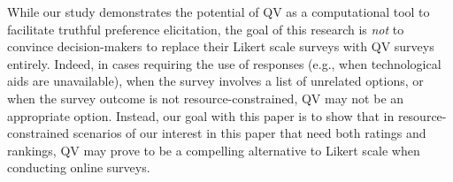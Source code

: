 While our study demonstrates the potential of QV as a computational tool to facilitate truthful preference elicitation, the goal of this research is \textit{not} to convince decision-makers to replace their Likert scale surveys with QV surveys entirely. Indeed, in cases requiring the use of  responses (e.g., when technological aids are unavailable), when the survey involves a list of unrelated options, or when the survey outcome is not resource-constrained,  QV may not be an appropriate option. Instead, our goal with this paper is to show that in resource-constrained scenarios of our interest in this paper that need both ratings and rankings, QV may prove to be a compelling alternative to Likert scale when conducting online surveys.  














